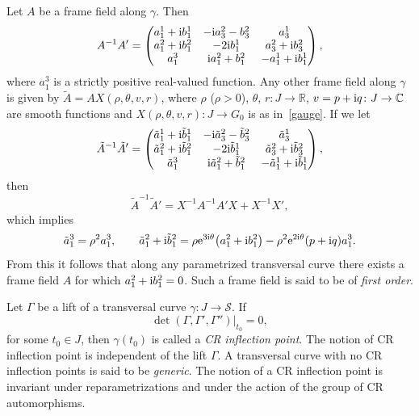 \documentclass[10pt,a4paper]{amsart}
\numberwithin{equation}{section}
\def\S{\mathcal{S}}
\def\S{\mathcal{S}}
\begin{document}
Let $A$ be a frame field along $\gamma$. Then
\[
A^{-1}A'=
\begin{pmatrix}
a_1^1 +{\rm i} b_1^1 & -{\rm i} a_3^2 - b_3^2 & a_3^1\\
a_1^2 +{\rm i} b_1^2 &-2{\rm i} b_1^1 & a_3^2 +{\rm i}b_3^2 \\
 a_1^3 &{\rm i} a_1^2 + b_1^2& -a_1^1 +{\rm i} b_1^1
 \end{pmatrix},
\]
where $a_1^3$ is a strictly positive real-valued function. Any other frame field along $\gamma$
is given by $\tilde A = AX(\rho,\theta,v,r)$, where
$\rho$ ($\rho>0$), $\theta$, $r \colon J \to \mathbb R$, $v=p+{\rm i}q \colon J\to \mathbb C$ are smooth functions
and $X(\rho,\theta,v,r)\colon J \to {G}_0$ is as in~\eqref{gauge}.
%
If we let
\[
\tilde A^{-1}\tilde A'=
\begin{pmatrix}
\tilde a_1^1 +{\rm i} \tilde b_1^1 & -{\rm i} \tilde a_3^2 - \tilde b_3^2 & \tilde a_3^1\\
\tilde a_1^2 +{\rm i} \tilde b_1^2 &-2{\rm i} \tilde b_1^1 & \tilde a_3^2 +{\rm i} \tilde b_3^2 \\
\tilde a_1^3 &{\rm i} \tilde a_1^2 + \tilde b_1^2& -\tilde a_1^1 +{\rm i} \tilde b_1^1
\end{pmatrix},
\]
then
\begin{equation*}%
\tilde A^{-1}\tilde A'= X^{ -1}A^{-1} A'X + X^{ -1}X',
\end{equation*}
which implies
\[
 \tilde a_1^3= \rho^2 a_1^3,\qquad
 \tilde a_1^2 +{\rm i} \tilde b_1^2 = \rho {\rm e}^{3{\rm i}\theta} \big(a_1^2 +{\rm i} b_1^2 \big) - \rho^2 {\rm e}^{2{\rm i}\theta} (p+{\rm i}q) a_1^3.
 \]
%
From this it follows
that along any parametrized transversal curve there exists
a frame field $A$ for which $a_1^2 +{\rm i} b_1^2=0$.
Such a frame field
is said to be of \textit{first order}.
%
\begin{Definition}
Let $\Gamma$ be a lift of a transversal curve $\gamma\colon J \to \S$.
If
\[
 \det(\Gamma,\Gamma',\Gamma'')|_{t_0} = 0,
\]
for some $t_0\in J$, then $\gamma({t_0})$ is called a \emph{CR inflection point}.
The notion of CR inflection point is independent of the lift $\Gamma$.
A transversal curve with no CR inflection points is said to be \emph{generic}.
The notion of a CR inflection point is invariant under reparametrizations and
under the action of the group of CR automorphisms.
\end{Definition}
\end{document}

